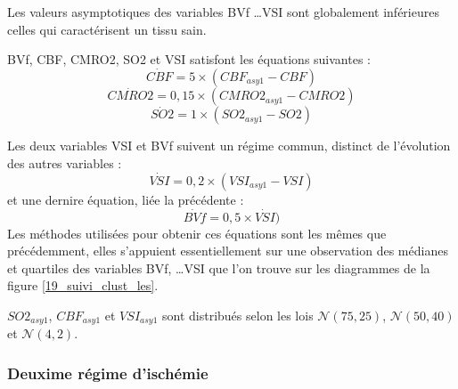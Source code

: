 \begin{enumerate}[label=\textbf{(L\'esion 1 - \arabic*)}]
\par
Les valeurs asymptotiques des variables BVf \dots VSI sont globalement inf\'erieures  celles qui caract\'erisent un tissu sain.

\par
BVf, CBF, CMRO2, SO2 et VSI satisfont les \'equations suivantes :
\begin{equation}
\dot{CBF}=5\times\left(CBF_{asy1}-CBF\right)
\end{equation}
\begin{equation}
\dot{CMRO2}=0,15\times\left(CMRO2_{asy1}-CMRO2\right)
\end{equation}
\begin{equation}
\dot{SO2}=1\times\left(SO2_{asy1}-SO2\right)
\end{equation}

Les deux variables VSI et BVf suivent un r\'egime commun, distinct de l'\'evolution des autres variables :
\begin{equation}
\dot{VSI}=0,2\times (VSI_{asy1}-VSI)
\end{equation}
et une dernire \'equation, li\'ee  la pr\'ec\'edente :
\begin{equation}
\dot{BVf}=0,5\times\dot{VSI})
\end{equation}
Les m\'ethodes utilis\'ees pour obtenir ces \'equations sont les m\^emes que pr\'ec\'edemment, %
elles s'appuient essentiellement sur une observation des m\'edianes et quartiles des variables BVf, %
\dots VSI que l'on trouve sur les diagrammes de la figure \ref{19_suivi_clust_les}.

\par
$SO2_{asy1}$, $CBF_{asy1}$ et $VSI_{asy1}$ sont distribu\'es selon les lois $\mathcal{N}(75,25)$, $\mathcal{N}(50,40)$ et $\mathcal{N}(4,2)$.
\end{enumerate}

\subsubsection{Deuxime r\'egime d'isch\'emie}

